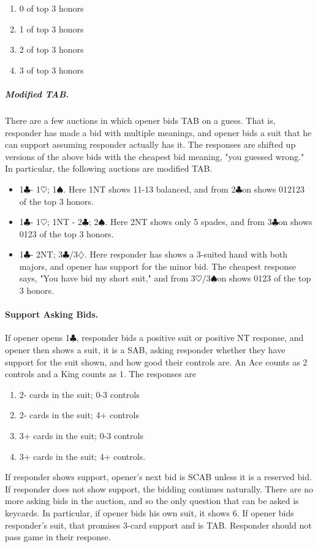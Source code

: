 \documentclass[10pt]{article}
\renewcommand{\c}{$\clubsuit$}
\renewcommand{\d}{$\diamondsuit$}
\newcommand{\h}{$\heartsuit$}
\newcommand{\s}{$\spadesuit$}
\begin{document}
\begin{multicols*}{2}
\begin{enumerate}
\item 0 of top 3 honors
\item 1 of top 3 honors
\item 2 of top 3 honors
\item 3 of top 3 honors
\end{enumerate}

\subparagraph{Modified TAB.}

There are a few auctions in which opener bids TAB on a guess. That is, responder
has made a bid with multiple meanings, and opener bids a suit that he can
support assuming responder actually has it. The responses are shifted up
versions of the above bids with the cheapest bid meaning, "you guessed wrong."
In particular, the following auctions are modified TAB.
\begin{itemize}
\item 1\c - 1\h; 1\s. Here 1NT shows 11-13 balanced, and from 2\c on shows
012123 of the top 3 honors.
\item 1\c - 1\h; 1NT - 2\c; 2\s. Here 2NT shows only 5 spades, and from 3\c on
shows 0123 of the top 3 honors.
\item 1\c- 2NT; 3\c/3\d. Here responder has shows a 3-suited hand with both
majors, and opener has support for the minor bid. The cheapest response
says, "You have bid my short suit," and from 3\h/3\s on shows 0123 of the
top 3 honors.
\end{itemize}

\paragraph{Support Asking Bids.}
If opener opens 1\c, responder bids a positive suit or positive NT response, and
opener then shows a suit, it is a SAB, asking responder whether they have
support for the suit shown, and how good their controls are. An Ace counts as 2
controls and a King counts as 1. The responses are
\begin{enumerate}
\item 2- cards in the suit; 0-3 controls
\item 2- cards in the suit; 4+ controls
\item 3+ cards in the suit; 0-3 controls
\item 3+ cards in the suit; 4+ controls.
\end{enumerate}

If responder shows support, opener’s next bid is SCAB unless it is a reserved
bid. If responder does not show support, the bidding continues naturally. There
are no more asking bids in the auction, and so the only question that can be
asked is keycards. In particular, if opener bids his own suit, it shows 6. If
opener bids responder’s suit, that promises 3-card support and is TAB. Responder
should not pass game in their response.


\end{multicols*}
\end{document}
